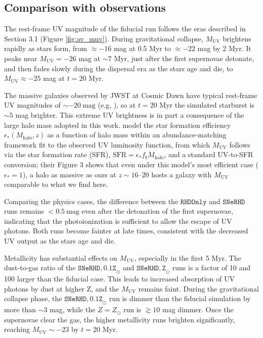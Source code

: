 \documentclass[twocolumn,linenumbers]{aastex631}
\begin{document}
\subsection{Comparison with observations}

The rest-frame UV magnitude of the fiducial run follows the eras described in Section 3.1 (Figure \ref{fig:av_muv}). During gravitational collapse, $M_\mathrm{UV}$ brightens rapidly as stars form, from $\approx -16$ mag at 0.5 Myr to $\approx -22$ mag by 2 Myr. It peaks near $M_\mathrm{UV} = -26$ mag at $\sim 7$ Myr, just after the first supernovae detonate, and then fades slowly during the dispersal era as the stars age and die, to $M_\mathrm{UV} \approx -25$ mag at $t = 20$ Myr.


The massive galaxies observed by JWST at Cosmic Dawn have typical rest-frame UV magnitudes of $\sim -20\ \mathrm{mag}$ (e.g, \citealt{2024A&A...691A..87M}), so at $t = 20$ Myr the simulated starburst is $\sim 5$ mag brighter. This extreme UV brightness is in part a consequence of the large halo mass adopted in this work. \citet{2025MNRAS.543.3802Y} model the star formation efficiency $\epsilon_*(M_\mathrm{halo},z)$ as a function of halo mass within an abundance-matching framework fit to the observed UV luminosity function, from which $M_\mathrm{UV}$ follows via the star formation rate (SFR), $\mathrm{SFR} = \epsilon_* f_b \dot{M}_\mathrm{halo}$, and a standard UV-to-SFR conversion; their Figure 3 shows that even under this model's most efficient case ($\epsilon_*=1$), a halo as massive as ours at $z\sim16$--20 hosts a galaxy with $M_\mathrm{UV}$ comparable to what we find here.

Comparing the physics cases, the difference between the $\mathtt{RHDOnly}$ and $\mathtt{SNeRHD}$ runs remains $< 0.5\ \mathrm{mag}$ even after the detonation of the first supernovae, indicating that the photoionization is sufficient to allow the escape of UV photons. Both runs become fainter at late times, consistent with the decreased UV output as the stars age and die.

Metallicity has substantial effects on $M_\mathrm{UV}$, especially in the first 5 Myr. The dust-to-gas ratio of the $\mathtt{SNeRHD,0.1Z}_\odot$ and $\mathtt{SNeRHD,Z}_\odot$ runs is a factor of 10 and 100 larger than the fiducial case. This leads to increased absorption of UV photons by dust at higher Z, and the $M_\mathrm{UV}$ remains faint. During the gravitational collapse phase, the $\mathtt{SNeRHD,0.1Z}_\odot$ run is dimmer than the fiducial simulation by more than $\sim3$ mag, while the $Z = Z_\odot$ run is $\gtrsim 10$ mag dimmer. Once the supernovae clear the gas, the higher metallicity runs brighten significantly, reaching $M_\mathrm{UV} \sim -23$ by $t=20$ Myr.
\end{document}
